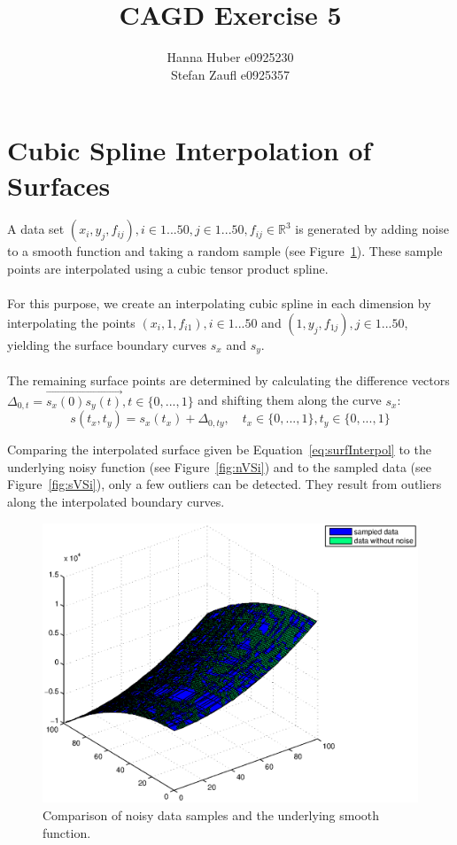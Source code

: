 \documentclass[12pt,a4paper]{article}
\title{CAGD Exercise 5}
\author{Hanna Huber e0925230\\Stefan Zaufl e0925357}
\begin{document}
\maketitle
\section{Cubic Spline Interpolation of Surfaces}

A data set $(x_i, y_j, f_{ij}), i\in 1...50, j\in 1...50,  f_{ij}\in\mathbb{R}^3$ is generated by adding noise to a smooth function and taking a random sample (see Figure~\ref{fig:sVSp}). These sample points are interpolated using a cubic tensor product spline. \\\\
%
For this purpose, we create an interpolating cubic spline in each dimension by interpolating the points $(x_i, 1, f_{i1}), i\in 1...50$ and $(1, y_j, f_{1j}), j\in 1...50$, yielding the surface boundary curves $s_x$ and $s_y$. \\\\
%
The remaining surface points are determined by calculating the difference vectors $\Delta_{0,t} = \overrightarrow{s_x(0)s_y(t)}, t\in\{0,...,1\}$ and shifting them along the curve $s_x$:
\begin{equation}\label{eq:surfInterpol}
s(t_x, t_y) = s_x(t_x) + \Delta_{0,ty}, \quad  t_x\in\{0,...,1\}, t_y\in\{0,...,1\}
\end{equation}

Comparing the interpolated surface given be Equation~\ref{eq:surfInterpol} to the underlying noisy function (see Figure~\ref{fig:nVSi}) and to the sampled data (see Figure~\ref{fig:sVSi}), only a few outliers can be detected. They result from outliers along the interpolated boundary curves.

\begin{figure}[hbtp]
\centering
\includegraphics[height=0.4\textheight]{sampledVSPure.eps}
\caption{Comparison of noisy data samples and the underlying smooth function.}
\label{fig:sVSp}
\end{figure}
\end{document}
